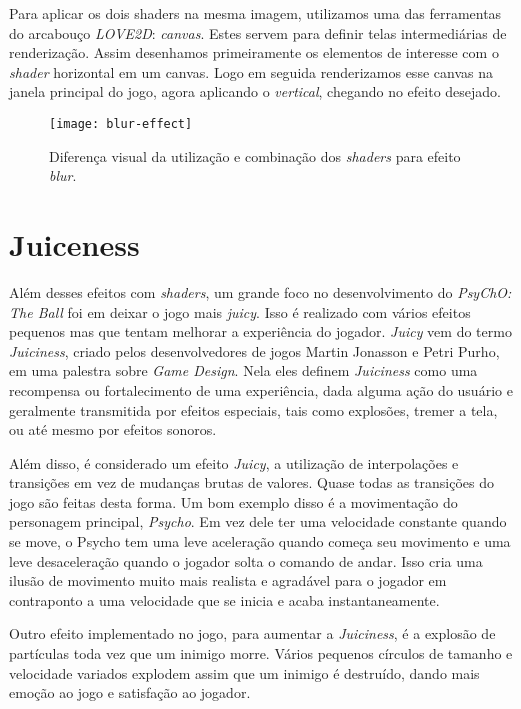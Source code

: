 Para aplicar os dois shaders na mesma imagem, utilizamos uma das ferramentas do arcabouço \textit{LOVE2D}: \textit{canvas}. Estes servem para definir telas intermediárias de renderização. Assim desenhamos primeiramente os elementos de interesse com o \textit{shader} horizontal em um canvas. Logo em seguida renderizamos esse canvas na janela principal do jogo, agora aplicando o \textit{vertical}, chegando no efeito desejado.

\begin{figure}[h!]
\texttt{[image: blur-effect]}
\centering
\caption{Diferença visual da utilização e combinação dos \textit{shaders} para efeito \textit{blur}.}
\end{figure}


\section{Juiceness}
\label{sec:juiceness}

Além desses efeitos com \textit{shaders}, um grande foco no desenvolvimento do \textit{PsyChO: The Ball} foi em deixar o jogo mais \textit{juicy}. Isso é realizado com vários efeitos pequenos mas que tentam melhorar a experiência do jogador. \textit{Juicy} vem do termo \textit{Juiciness}, criado pelos desenvolvedores de jogos Martin Jonasson e Petri Purho, em uma palestra sobre \textit{Game Design}\cite{martinpetri}. Nela eles definem \textit{Juiciness} como uma recompensa ou fortalecimento de uma experiência, dada alguma ação do usuário e geralmente transmitida por efeitos especiais, tais como explosões, tremer a tela, ou até mesmo por efeitos sonoros.

Além disso, é considerado um efeito \textit{Juicy}, a utilização de interpolações e transições em vez de mudanças brutas de valores. Quase todas as transições do jogo são feitas desta forma. Um bom exemplo disso é a movimentação do personagem principal, \textit{Psycho}. Em vez dele ter uma velocidade constante quando se move, o Psycho tem uma leve aceleração quando começa seu movimento e uma leve desaceleração quando o jogador solta o comando de andar. Isso cria uma ilusão de movimento muito mais realista e agradável para o jogador em contraponto a uma velocidade que se inicia e acaba instantaneamente.

Outro efeito implementado no jogo, para aumentar a \textit{Juiciness}, é a explosão de partículas toda vez que um inimigo morre. Vários pequenos círculos de tamanho e velocidade variados explodem assim que um inimigo é destruído, dando mais emoção ao jogo e satisfação ao jogador.

